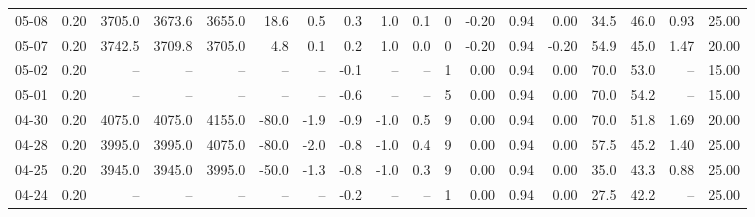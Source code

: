 \begin{threeparttable}
{\begin{tabular}{lrrrrrrrrrrrrrrrrr}
  05-08 &     0.20 & 3705.0 & 3673.6 & 3655.0 &       18.6 &            0.5 &                       0.3 &                      1.0 &                 0.1 &              0 &      -0.20 &      0.94 &           0.00 &             34.5 &                46.0 &            0.93 &                  25.00 \\
  05-07 &     0.20 & 3742.5 & 3709.8 & 3705.0 &        4.8 &            0.1 &                       0.2 &                      1.0 &                 0.0 &              0 &      -0.20 &      0.94 &          -0.20 &             54.9 &                45.0 &            1.47 &                  20.00 \\
  05-02 &     0.20 &     -- &     -- &     -- &         -- &             -- &                      -0.1 &                       -- &                  -- &              1 &       0.00 &      0.94 &           0.00 &             70.0 &                53.0 &              -- &                  15.00 \\
  05-01 &     0.20 &     -- &     -- &     -- &         -- &             -- &                      -0.6 &                       -- &                  -- &              5 &       0.00 &      0.94 &           0.00 &             70.0 &                54.2 &              -- &                  15.00 \\
  04-30 &     0.20 & 4075.0 & 4075.0 & 4155.0 &      -80.0 &           -1.9 &                      -0.9 &                     -1.0 &                 0.5 &              9 &       0.00 &      0.94 &           0.00 &             70.0 &                51.8 &            1.69 &                  20.00 \\
  04-28 &     0.20 & 3995.0 & 3995.0 & 4075.0 &      -80.0 &           -2.0 &                      -0.8 &                     -1.0 &                 0.4 &              9 &       0.00 &      0.94 &           0.00 &             57.5 &                45.2 &            1.40 &                  25.00 \\
  04-25 &     0.20 & 3945.0 & 3945.0 & 3995.0 &      -50.0 &           -1.3 &                      -0.8 &                     -1.0 &                 0.3 &              9 &       0.00 &      0.94 &           0.00 &             35.0 &                43.3 &            0.88 &                  25.00 \\
  04-24 &     0.20 &     -- &     -- &     -- &         -- &             -- &                      -0.2 &                       -- &                  -- &              1 &       0.00 &      0.94 &           0.00 &             27.5 &                42.2 &              -- &                  25.00 \\

\end{tabular}}
\end{threeparttable}
